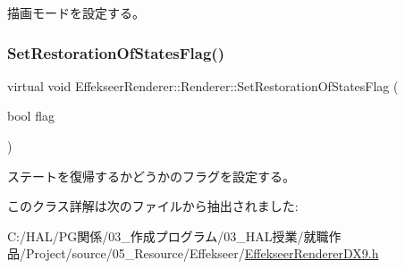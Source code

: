 描画モードを設定する。 

\mbox{\label{class_effekseer_renderer_1_1_renderer_ac6de8a0c0d65c03d3242ccfc9946c91c}} 
\subsubsection{\texorpdfstring{Set\+Restoration\+Of\+States\+Flag()}{SetRestorationOfStatesFlag()}}
{\footnotesize\ttfamily virtual void Effekseer\+Renderer\+::\+Renderer\+::\+Set\+Restoration\+Of\+States\+Flag (\begin{DoxyParamCaption}\item[{bool}]{flag }\end{DoxyParamCaption})\hspace{0.3cm}{\ttfamily [pure virtual]}}



ステートを復帰するかどうかのフラグを設定する。 



このクラス詳解は次のファイルから抽出されました\+:\begin{DoxyCompactItemize}
\item 
C\+:/\+H\+A\+L/\+P\+G関係/03\+\_\+作成プログラム/03\+\_\+\+H\+A\+L授業/就職作品/\+Project/source/05\+\_\+\+Resource/\+Effekseer/\mbox{\hyperlink{_effekseer_renderer_d_x9_8h}{Effekseer\+Renderer\+D\+X9.\+h}}\end{DoxyCompactItemize}
